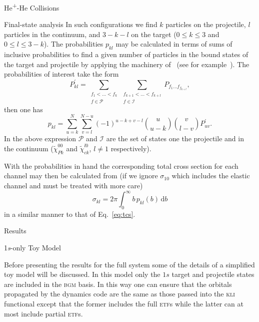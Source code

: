 \documentclass[letterpaper, 11 pt]{report}
\begin{document}
\begin{chapter}{\texorpdfstring{He\textsuperscript{+}}{He+}-He Collisions \label{chap:hephe}}
\begin{section}{Final-state analysis \label{sec:hephe-det}}
      In such configurations we find $k$ particles on the projectile, $l$ particles in the continuum,
      and $3 - k - l$ on the target ($0\leq k \leq 3$ and $0 \leq l \leq 3 - k$). The probabilities
      $p_{kl}$ may be calculated in terms of sums of inclusive probabilities to find a given number of
      particles in the bound states of the target and projectile by applying the machinery
      of~\cite{inc-prob} (see for example~\cite{incEx, mitsuko12, gerald15}). The probabilities of
      interest take the form
      \begin{equation} \label{eq:probGer1}
         P^\prime_{kl} = \sum\limits_{\substack{f_1 < \dots < f_k \\ f \in \mathcal{P}}}
                         \sum\limits_{\substack{f_{k+1} < \dots < f_{k+l} \\ f \in \mathcal{I}}}
                         P_{f_1 \dots f_{f_{k+l}}},
      \end{equation}
      then one has
      \begin{equation} \label{eq:probGer2}
         p_{kl} = \sum\limits_{u = k}^N \sum\limits_{v = l}^{N-u} (-1)^{u - k + v -l}
                   {{u}\choose{u-k}} {{v}\choose{l - v}} P^\prime_{uv}.
      \end{equation}
      In the above expression $\mathcal{P}$ and $\mathcal{I}$ are the set of states one the projectile
      and in the continuum ($\tilde{\chi}^{00}_{Pk}$ and $\tilde{\chi}^{l0}_{ck}$, $l \neq 1$
      respectively).

      With the probabilities in hand the corresponding total cross section for each channel may then be
      calculated from (if we ignore $\sigma_{10}$ which includes the elastic channel and must be treated
      with more care)
      \begin{equation} \label{eq:cross}
         \sigma_{kl} = 2 \pi \int_0^\infty b \, p_{kl}(b) \, \mathrm{d}b
      \end{equation}
      in a similar manner to that of Eq.~\eqref{eq:tcs}.

   \end{section}

   \begin{section}{Results \label{sec:hephe-disc}}

      \begin{subsection}{1\textit{s}-only Toy Model \label{sec:toy}}

         Before presenting the results for the full system some of the details of a simplified toy model
         will be discussed. In this model only the $1s$ target and projectile states are included in
         the \textsc{bgm} basis. In this way one can ensure that the orbitals propagated by the dynamics
         code are the same as those passed into the \textsc{kli} functional except that the former
         includes the full \textsc{etf}s while the latter can at most include partial \textsc{etf}s.


\end{subsection}
\end{section}
\end{chapter}
\end{document}

